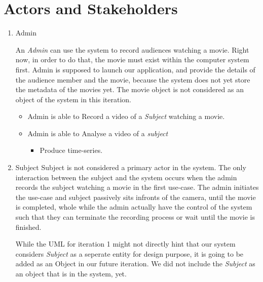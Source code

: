 \documentclass[12pt,a4paper,man]{report}
\begin{document}
\section{Actors and Stakeholders}
\label{sec:org6cf5990}
\begin{enumerate}
\item Admin
\label{sec:orgf682405}

An \emph{Admin} can use the system to record audiences watching a movie. Right now, in order to do that, the movie must exist within the computer system first. Admin is supposed to launch our application, and provide the details of the audience member and the movie, because the system does not yet store the metadata of the movies yet. The movie object is not considered as an object of the system in this iteration.

\begin{itemize}
\item Admin is able to Record a video of a \emph{Subject} watching a movie.
\item Admin is able to Analyse a video of a \emph{subject}
\begin{itemize}
\item Produce time-series.
\end{itemize}
\end{itemize}

\item Subject
\label{sec:org6eeaa69}
Subject is not considered a primary actor in the system. The only interaction between the subject and the system occurs when the admin records the subject watching a movie in the first use-case. The admin initiates the use-case and subject passively sits infronts of the camera, until the movie is completed, whole while the admin actually have the control of the system such that they can terminate the recording process or wait until the movie is finished.

While the UML for iteration 1 might not directly hint that our system considers \emph{Subject} as a seperate entity for design purpose, it is going to be added as an Object in our future iteration. We did not include the \emph{Subject} as an object that is in the system, yet.
\end{enumerate}
\end{document}
